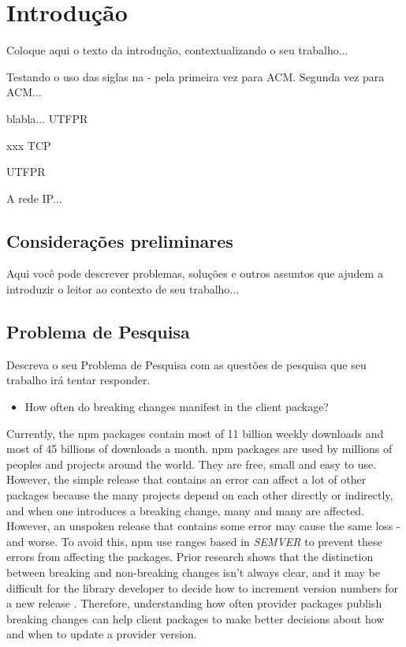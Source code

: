 \chapter{Introdução}
\label{cap:introducao}

Coloque aqui o texto da introdução, contextualizando o seu trabalho...

Testando o uso das siglas na - pela primeira vez para \gls{ACM}. Segunda vez para \gls{ACM}...

blabla... \gls{UTFPR}

xxx \gls{TCP}

\acrlong{UTFPR}

A rede \gls{IP}...

\section{Considerações preliminares}

Aqui você pode descrever problemas, soluções e outros assuntos que ajudem a introduzir o leitor ao contexto de seu trabalho...

\section{Problema de Pesquisa}
\label{cap:introducao:sec:problema:pesquisa}

Descreva o seu Problema de Pesquisa com as questões de pesquisa que seu trabalho irá tentar responder.

\begin{itemize}
    \item How often do breaking changes manifest in the client package?
\end{itemize}
Currently, the npm packages contain most of 11 billion weekly downloads and most of 45 billions of downloads a month. npm packages are used by millions of peoples and projects around the world. They are free, small and easy to use. However, the simple release that contains an error can affect a lot of other packages because the many projects depend on each other directly or indirectly, and when one introduces a breaking change, many and many are affected. However, an unspoken release that contains some error may cause the same loss - and worse. To avoid this, npm use ranges based in \textit{SEMVER} to prevent these errors from affecting the packages. Prior research shows that the distinction between breaking and non-breaking changes isn’t always clear, and it may be difficult for the library developer to decide how to increment version numbers for a new release \cite{noregrets2018}. Therefore, understanding how often provider packages publish breaking changes can help client packages to make better decisions about how and when to update a provider version.


